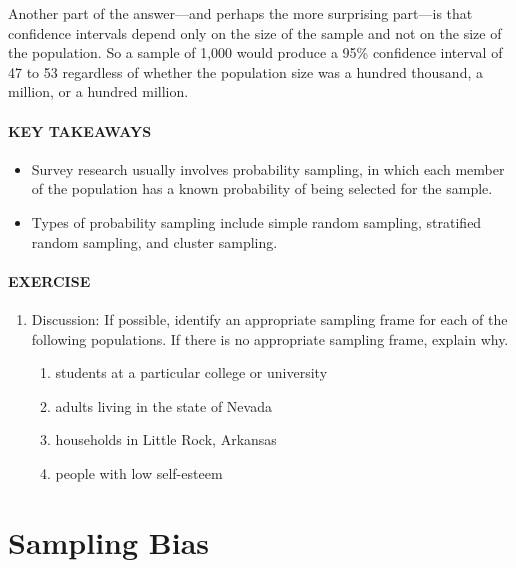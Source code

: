 \documentclass[
]{krantz}
\providecommand{\tightlist}{%
  \setlength{\itemsep}{0pt}\setlength{\parskip}{0pt}}
\begin{document}
Another part of the answer---and perhaps the more surprising part---is that confidence intervals depend only on the size of the sample and not on the size of the population. So a sample of 1,000 would produce a 95\% confidence interval of 47 to 53 regardless of whether the population size was a hundred thousand, a million, or a hundred million.

\hypertarget{key-takeaways-17}{%
\paragraph*{KEY TAKEAWAYS}\label{key-takeaways-17}}

\begin{itemize}
\tightlist
\item
  Survey research usually involves probability sampling, in which each member of the population has a known probability of being selected for the sample.
\item
  Types of probability sampling include simple random sampling, stratified random sampling, and cluster sampling.
\end{itemize}

\hypertarget{exercise-2}{%
\paragraph*{EXERCISE}\label{exercise-2}}

\begin{enumerate}
\def\labelenumi{\arabic{enumi}.}
\tightlist
\item
  Discussion: If possible, identify an appropriate sampling frame for each of the following populations. If there is no appropriate sampling frame, explain why.

  \begin{enumerate}
  \def\labelenumii{\alph{enumii}.}
  \tightlist
  \item
    students at a particular college or university
  \item
    adults living in the state of Nevada
  \item
    households in Little Rock, Arkansas
  \item
    people with low self-esteem
  \end{enumerate}
\end{enumerate}

\hypertarget{sampling-bias}{%
\section{Sampling Bias}\label{sampling-bias}}
\end{document}
